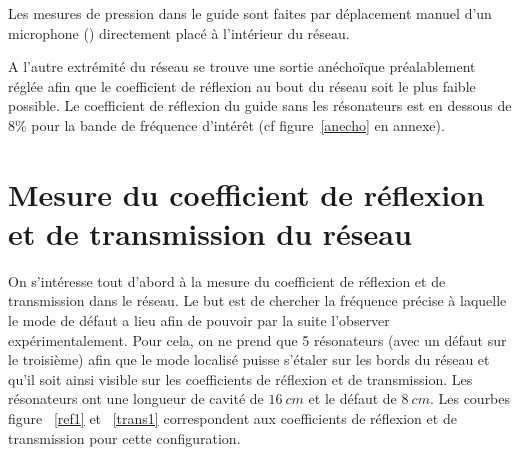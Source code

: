 Les mesures de pression dans le guide sont faites par déplacement manuel d'un microphone (\textcolor[red]{reference}) directement placé à l'intérieur du réseau.




\bigskip

A l'autre extrémité du réseau se trouve une sortie anéchoïque préalablement réglée afin que le coefficient de réflexion au bout du réseau soit le plus faible possible. Le coefficient de réflexion du guide sans les résonateurs est en dessous de 8\% pour la bande de fréquence d'intérêt (cf figure~\ref{anecho} en annexe).


\section{Mesure du coefficient de réflexion et de transmission du réseau}
On s'intéresse tout d'abord à la mesure du coefficient de réflexion et de transmission dans le réseau. Le but est de chercher la fréquence précise à laquelle le mode de défaut a lieu afin de pouvoir par la suite l'observer expérimentalement. Pour cela, on ne prend que 5 résonateurs (avec un défaut sur le troisième) afin que le mode localisé puisse s'étaler sur les bords du réseau et qu'il soit ainsi visible sur les coefficients de réflexion et de transmission. Les résonateurs ont une longueur de cavité de $16~cm$ et le défaut de $8~cm$. Les courbes figure ~\ref{ref1} et ~\ref{trans1} correspondent aux coefficients de réflexion et de transmission pour cette configuration.

